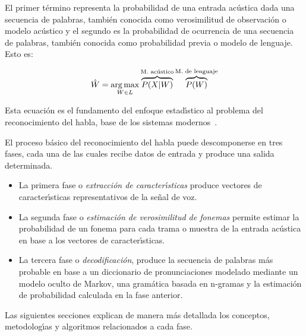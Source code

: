 El primer t\'ermino representa la probabilidad de una entrada ac\'ustica dada una secuencia de palabras, tambi\'en
conocida como verosimilitud de observaci\'on o modelo ac\'ustico y el segundo es la probabilidad 
de ocurrencia de una secuencia de palabras, tambi\'en conocida como probabilidad previa o modelo de lenguaje. Esto es:

\begin{equation*}
\hat{W} = \operatorname*{arg\,max}_{W \in L} \overbrace{P(X|W)}^\text{M. ac\'ustico}\overbrace{P(W)}^\text{M. de lenguaje}
\end{equation*}

Esta ecuaci\'on es el fundamento del enfoque estad{\'\i}stico al problema del reconocimiento del habla, base de los
sistemas \mbox{modernos \cite{RabinerStatistical2006}}.

El proceso b\'asico del reconocimiento del habla puede descomponerse en tres fases, cada una de las cuales recibe
datos de entrada y produce una salida determinada.

\begin{itemize}
\item La primera fase o \emph{extracci\'on de caracter{\'\i}sticas} produce vectores de caracter{\'\i}sticas representativos de la se\~nal de voz.
\item La segunda fase o \emph{estimaci\'on de verosimilitud de fonemas} permite estimar la probabilidad de un fonema para cada trama o muestra de la entrada ac\'ustica en base a los vectores de caracter{\'\i}sticas.
\item La tercera fase o \emph{decodificaci\'on}, produce la secuencia de palabras m\'as probable en base a un diccionario de pronunciaciones modelado mediante un modelo oculto de Markov, una gram\'atica basada en n-gramas y la estimaci\'on de probabilidad calculada en la fase anterior.
\end{itemize}

Las siguientes secciones explican de manera m\'as detallada los conceptos, metodolog{\'\i}as y algoritmos relacionados a cada fase.



